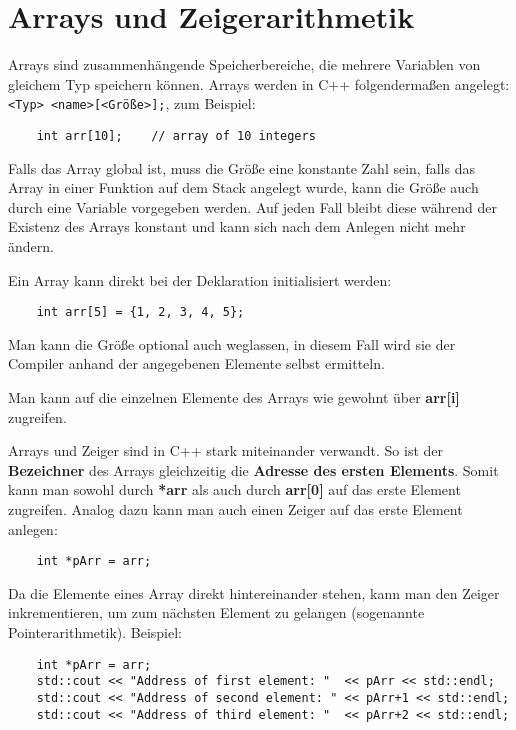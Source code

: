 \section{Arrays und Zeigerarithmetik}
Arrays sind zusammenhängende Speicherbereiche, die mehrere Variablen von gleichem Typ speichern können.
Arrays werden in C++ folgendermaßen angelegt: \lstinline{<Typ> <name>[<Größe>];}, zum Beispiel:

\begin{lstlisting}
	int arr[10];	// array of 10 integers
\end{lstlisting}

Falls das Array global ist, muss die Größe eine konstante Zahl sein, falls das Array in einer Funktion auf dem Stack angelegt wurde, kann die Größe auch durch eine Variable vorgegeben werden.
Auf jeden Fall bleibt diese während der Existenz des Arrays konstant und kann sich nach dem Anlegen nicht mehr ändern.

Ein Array kann direkt bei der Deklaration initialisiert werden:

\begin{lstlisting}
	int arr[5] = {1, 2, 3, 4, 5};
\end{lstlisting}

Man kann die Größe optional auch weglassen, in diesem Fall wird sie der Compiler anhand der angegebenen Elemente selbst ermitteln.

Man kann auf die einzelnen Elemente des Arrays wie gewohnt über \textbf{arr[i]} zugreifen.

Arrays und Zeiger sind in C++ stark miteinander verwandt.
So ist der \textbf{Bezeichner} des Arrays gleichzeitig die \textbf{Adresse des ersten Elements}.
Somit kann man sowohl durch \textbf{*arr} als auch durch \textbf{arr[0]} auf das erste Element zugreifen.
Analog dazu kann man auch einen Zeiger auf das erste Element anlegen:

\begin{lstlisting}
	int *pArr = arr;
\end{lstlisting}

Da die Elemente eines Array direkt hintereinander stehen, kann man den Zeiger inkrementieren, um zum  nächsten Element zu gelangen (sogenannte Pointerarithmetik).
Beispiel:

\begin{lstlisting}
	int *pArr = arr;
	std::cout << "Address of first element: "  << pArr << std::endl;
	std::cout << "Address of second element: " << pArr+1 << std::endl;
	std::cout << "Address of third element: "  << pArr+2 << std::endl;
\end{lstlisting}

